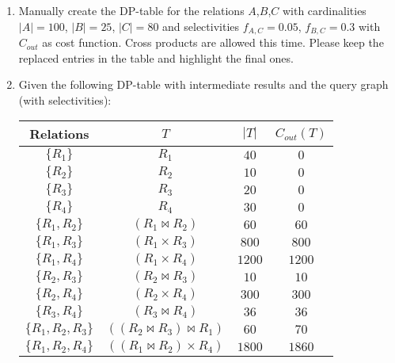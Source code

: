 \begin{enumerate}
  \item
        Manually create the DP-table for the relations $A$,$B$,$C$ with cardinalities $|A|=100$, $|B|=25$, $|C|=80$ and selectivities $f_{A,C}=0.05$,
        $f_{B,C}=0.3$ with $C_{out}$ as cost function.
        Cross products are allowed this time.
        Please keep the replaced entries in the table and highlight the final ones.

  \item
        Given the following DP-table with intermediate results and the query graph (with selectivities):

        \begin{minipage}{0.6\textwidth}
          \begin{tabular}{|c|c|c|c|} \hline
            {\bf Relations}   & $T$                            & $|T|$  & $C_{out}(T)$ \\ \hline \hline
            $\{R_1\}$         & $R_1$                          & $40$   & $0$          \\ \hline 
            $\{R_2\}$         & $R_2$                          & $10$   & $0$          \\ \hline 
            $\{R_3\}$         & $R_3$                          & $20$   & $0$          \\ \hline 
            $\{R_4\}$         & $R_4$                          & $30$   & $0$          \\ \hline 
            $\{R_1,R_2\}$     & $(R_1 \Join R_2)$              & $60$   & $60$         \\ \hline 
            $\{R_1,R_3\}$     & $(R_1 \times R_3)$             & $800$  & $800$        \\ \hline 
            $\{R_1,R_4\}$     & $(R_1 \times R_4)$             & $1200$ & $1200$       \\ \hline 
            $\{R_2,R_3\}$     & $(R_2 \Join R_3)$              & $10$   & $10$         \\ \hline 
            $\{R_2,R_4\}$     & $(R_2 \times R_4)$             & $300$  & $300$        \\ \hline 
            $\{R_3,R_4\}$     & $(R_3 \Join R_4)$              & $36$   & $36$         \\ \hline 
            $\{R_1,R_2,R_3\}$ & $((R_2 \Join R_3) \Join R_1)$  & $60$   & $70$         \\ \hline 
            $\{R_1,R_2,R_4\}$ & $((R_1 \Join R_2) \times R_4)$ & $1800$ & $1860$       \\ \hline 

\end{tabular}
\end{minipage}
\end{enumerate}
